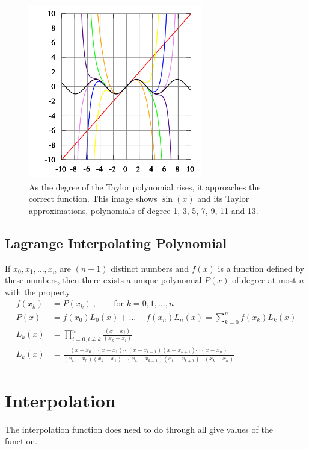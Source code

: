 \documentclass[12pt]{article}
\begin{document}
\begin{figure}[h!]
\begin{center}
\includegraphics[height=3in,clip]{TaylorSinEg}
\caption{As the degree of the Taylor polynomial rises, it approaches the correct function. This image shows $\sin(x)$ and its Taylor approximations, polynomials of degree 1, 3, 5, 7, 9, 11 and 13.}
\end{center}
\end{figure}

\subsection{Lagrange Interpolating Polynomial}
If $x_0, x_1,\dots, x_n$ are $(n+1)$ distinct numbers and $f(x)$ is a function defined by these numbers, then there exists a unique polynomial $P(x)$ of degree at most $n$ with the property
%
\begin{align}
f(x_k) &= P(x_k)\:, \qquad \text{for }k= 0, 1, \dots, n \\
%
P(x) &= f(x_0)L_0(x) + \dots + f(x_n)L_n(x) = \sum_{k=0}^{n}f(x_k)L_k(x) \\
%
L_k(x) &= \prod_{i=0, i \neq k}^n \frac{(x-x_i)}{(x_k-x_i)}\\
%
L_k(x) &= \frac{(x-x_0)(x-x_1)\cdots(x-x_{k-1})(x-x_{k+1})\cdots(x-x_n)}{(x_k-x_0)(x_k-x_1)\cdots(x_k-x_{k-1})(x_k-x_{k+1})\cdots(x_k-x_n)}
\end{align}




\section{Interpolation}
The interpolation function does need to do
through all give values of the function.

%
% 
\end{document}
